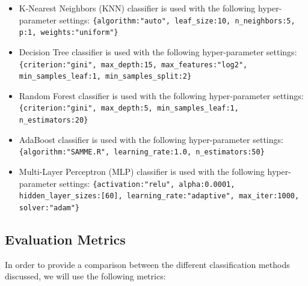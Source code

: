 \begin{itemize}[]
    \item K-Nearest Neighbors (KNN) classifier is used with the following hyper-parameter settings: \texttt{\{algorithm:"auto", leaf\_size:10, n\_neighbors:5, p:1, weights:"uniform"\}}

    \item Decision Tree classifier is used with the following hyper-parameter settings: \texttt{\{criterion:"gini", max\_depth:15, max\_features:"log2", min\_samples\_leaf:1, min\_samples\_split:2\}}

    \item Random Forest classifier is used with the following hyper-parameter settings: \texttt{\{criterion:"gini", max\_depth:5, min\_samples\_leaf:1, n\_estimators:20\}}

    \item AdaBoost classifier is used with the following hyper-parameter settings: \texttt{\{algorithm:"SAMME.R", learning\_rate:1.0, n\_estimators:50\}}

    \item Multi-Layer Perceptron (MLP) classifier is used with the following hyper-parameter settings: \texttt{\{activation:"relu", alpha:0.0001, hidden\_layer\_sizes:[60], learning\_rate:"adaptive", max\_iter:1000, solver:"adam"\}}
\end{itemize}


\subsection{Evaluation Metrics}

In order to provide a comparison between the different classification methods discussed, we will use the following metrics:

